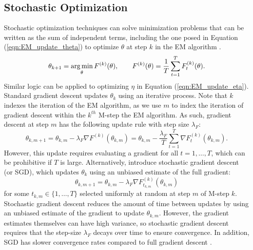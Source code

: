 \subsection{Stochastic Optimization}
\label{subsec:stoch_optim}

Stochastic optimization techniques can solve minimization problems that can be written as the sum of independent terms, including the one posed in Equation (\ref{eqn:EM_update_theta}) to optimize $\theta$ at step $k$ in the EM algorithm \citep{Robbins:1951}.
%
\begin{equation}
    \theta_{k+1} = \operatorname*{arg\,min}_{\theta} F^{(k)}(\theta), \qquad F^{(k)}(\theta) = \frac{1}{T}\sum_{t = 1}^T F^{(k)}_t(\theta).
\end{equation}
%
Similar logic can be applied to optimizing $\eta$ in Equation (\ref{eqn:EM_update_eta}).
%
Standard gradient descent updates $\theta_k$ using an iterative process. Note that $k$ indexes the iteration of the EM algorithm, as we use $m$ to index the iteration of gradient descent within the $k^{th}$ M-step the EM algorithm. As such, gradient descent at step $m$ has the following update rule with step size $\lambda_F$:
%
\begin{equation}
    \theta_{k,m+1} = \theta_{k,m} - \lambda_F \nabla F^{(k)}(\theta_{k,m}) =  \theta_{k,m} - \frac{\lambda_F}{T} \sum_{t=1}^T \nabla F^{(k)}_t(\theta_{k,m}).
\end{equation}
%
However, this update requires evaluating a gradient for all $t = 1,\ldots,T$, which can be prohibitive if $T$ is large. Alternatively, \citet{Robbins:1951} introduce stochastic gradient descent (or SGD), which updates $\theta_k$ using an unbiased estimate of the full gradient:
%
\begin{equation}
    \theta_{k,m+1} = \theta_{k,m} - \lambda_F \nabla F^{(k)}_{t_{k,m}}(\theta_{k,m})
\end{equation}
%
for some $t_{k,m} \in \{1,\ldots,T\}$ selected uniformly at random at step $m$ of M-step $k$. Stochastic gradient descent reduces the amount of time between updates by using an unbiased estimate of the gradient to update $\theta_{k,m}$. However, the gradient estimates themselves can have high variance, so stochastic gradient descent requires that the step-size $\lambda_F$ decays over time to ensure convergence. In addition, SGD has slower convergence rates compared to full gradient descent \citep{Schmidt:2017}.

